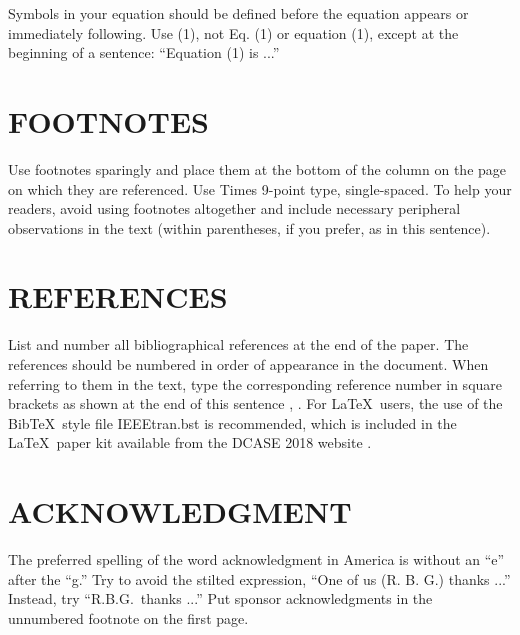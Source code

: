 \documentclass{article}
\begin{document}
\begin{sloppy}
Symbols in your equation should be defined before the equation appears or immediately following.  Use (1), not Eq. (1) or equation (1), except at the beginning of a sentence:  ``Equation (1) is ...''



\section{FOOTNOTES}
\label{sec:foot}

Use footnotes sparingly and place them at the bottom of the column on the page on which they are referenced. Use Times 9-point type, single-spaced. To help your readers, avoid using footnotes altogether and include necessary peripheral observations in the text (within parentheses, if you prefer, as in this sentence).

\section{REFERENCES}
\label{sec:ref}

List and number all bibliographical references at the end of the paper. The references should be numbered in order of appearance in the document. When referring to them in the text, type the corresponding reference number in square brackets as shown at the end of this sentence \cite{cJones2003}, \cite{aSmith2000}. For \LaTeX\ users, the use of the Bib\TeX\ style file IEEEtran.bst is recommended, which is included in the \LaTeX\ paper kit available from the DCASE 2018 website \cite{dcase2018web}.

\section{ACKNOWLEDGMENT}
\label{sec:ack}

The preferred spelling of the word acknowledgment in America is without an ``e'' after the ``g.'' Try to avoid the stilted expression, ``One of us (R. B. G.) thanks ...'' Instead, try ``R.B.G.\ thanks ...''  Put sponsor acknowledgments in the unnumbered footnote on the first page.


\end{sloppy}
\end{document}
